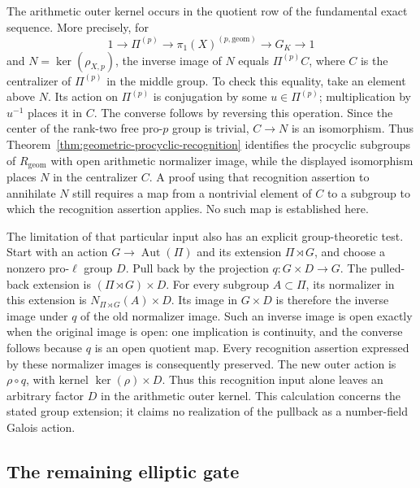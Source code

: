 The arithmetic outer kernel occurs in the quotient row of the
fundamental exact sequence. More precisely, for
\[
 1\longrightarrow\Pi^{(p)}\longrightarrow
 \pi_1(X)^{(p,\mathrm{geom})}\longrightarrow G_K\longrightarrow1
\]
and \(N=\ker(\rho_{X,p})\), the inverse image of \(N\) equals
\(\Pi^{(p)}C\), where \(C\) is the centralizer of \(\Pi^{(p)}\)
in the middle group. To check this equality, take an element
above \(N\). Its action on \(\Pi^{(p)}\) is conjugation by some
\(u\in\Pi^{(p)}\); multiplication by \(u^{-1}\) places it in \(C\).
The converse follows by reversing this operation.
Since the center of the rank-two free pro-\(p\) group is trivial,
\(C\to N\) is an isomorphism. Thus Theorem~\ref{thm:geometric-procyclic-recognition} identifies the
procyclic subgroups of \(R_{\mathrm{geom}}\) with open arithmetic
normalizer image, while the displayed isomorphism places \(N\)
in the centralizer \(C\). A proof using that
recognition assertion to annihilate \(N\) still requires a map
from a nontrivial element of \(C\) to a subgroup to which the
recognition assertion applies. No such map is established here.

The limitation of that particular input also has an explicit
group-theoretic test. Start with an action \(G\to\operatorname{Aut}(\Pi)\)
and its extension \(\Pi\rtimes G\), and choose a nonzero pro-\(\ell\)
group \(D\). Pull back by the projection
\(q:G\times D\to G\). The pulled-back extension is
\((\Pi\rtimes G)\times D\). For every subgroup \(A\subset\Pi\),
its normalizer in this extension is
\(N_{\Pi\rtimes G}(A)\times D\). Its image in \(G\times D\)
is therefore the inverse image under \(q\) of the old normalizer
image. Such an inverse image is open exactly when the original
image is open: one implication is continuity, and the converse
follows because \(q\) is an open quotient map. Every recognition
assertion expressed by these normalizer images is consequently
preserved. The new outer action is \(\rho\circ q\), with kernel
\(\ker(\rho)\times D\). Thus this recognition input alone leaves
an arbitrary factor \(D\) in the arithmetic outer kernel.
This calculation concerns the stated group extension; it claims
no realization of the pullback as a number-field Galois action.

\subsection{The remaining elliptic gate}

